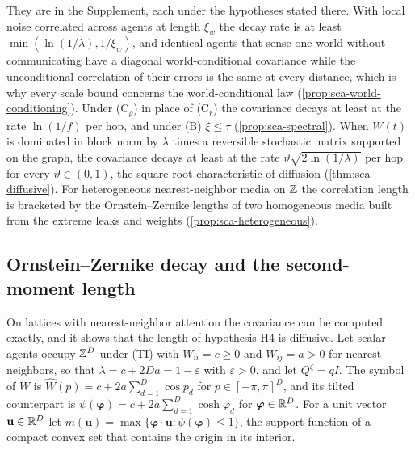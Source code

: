 They are in the Supplement, each under the hypotheses stated there. With local noise correlated across agents at length $\xi_w$ the decay rate is at least $\min(\ln(1/\lambda),1/\xi_w)$, and identical agents that sense one world without communicating have a diagonal world-conditional covariance while the unconditional correlation of their errors is the same at every distance, which is why every scale bound concerns the world-conditional law (\cref{prop:sca-world-conditioning}). Under \textup{(C$_\rho$)} in place of \textup{(C$_r$)} the covariance decays at least at the rate $\ln(1/f)$ per hop, and under \textup{(B)} $\xi\le\tau$ (\cref{prop:sca-spectral}). When $W(t)$ is dominated in block norm by $\lambda$ times a reversible stochastic matrix supported on the graph, the covariance decays at least at the rate $\vartheta\sqrt{2\ln(1/\lambda)}$ per hop for every $\vartheta\in(0,1)$, the square root characteristic of diffusion (\cref{thm:sca-diffusive}). For heterogeneous nearest-neighbor media on $\mathbb{Z}$ the correlation length is bracketed by the Ornstein--Zernike lengths of two homogeneous media built from the extreme leaks and weights (\cref{prop:sca-heterogeneous}).

\subsection{Ornstein--Zernike decay and the second-moment length}\label{sec:sca-oz}

On lattices with nearest-neighbor attention the covariance can be computed exactly, and it shows that the length of hypothesis H4 is diffusive. Let scalar agents occupy $\mathbb{Z}^D$ under \textup{(TI)} with $W_{ii}=c\ge0$ and $W_{ij}=a>0$ for nearest neighbors, so that $\lambda=c+2Da=1-\varepsilon$ with $\varepsilon>0$, and let $Q^\zeta=qI$. The symbol of $W$ is $\hat W(p)=c+2a\sum_{d=1}^D\cos p_d$ for $p\in[-\pi,\pi]^D$, and its tilted counterpart is $\psi(\boldsymbol\varphi)=c+2a\sum_{d=1}^D\cosh\varphi_d$ for $\boldsymbol\varphi\in\mathbb{R}^D$. For a unit vector $\mathbf u\in\mathbb{R}^D$ let $m(\mathbf u)=\max\{\boldsymbol\varphi\cdot\mathbf u:\psi(\boldsymbol\varphi)\le1\}$, the support function of a compact convex set that contains the origin in its interior.

